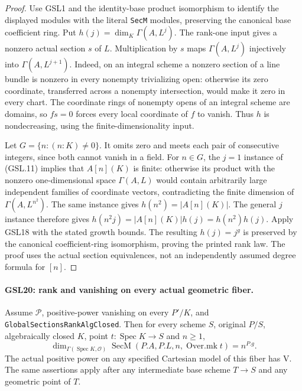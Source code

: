 \begin{proof}
Use GSL1 and the identity-base product isomorphism to identify
the displayed modules with the literal \texttt{SecM} modules,
preserving the canonical base coefficient ring.  Put
$h(j)=\dim_K\Gamma(A,L^j)$.  The rank-one input gives a nonzero
actual section $s$ of $L$.  Multiplication by $s$ maps
$\Gamma(A,L^j)$ injectively into $\Gamma(A,L^{j+1})$.
Indeed, on an integral scheme a nonzero section of a line bundle
is nonzero in every nonempty trivializing open: otherwise its
zero coordinate, transferred across a nonempty intersection,
would make it zero in every chart.  The coordinate rings of
nonempty opens of an integral scheme are domains, so
$fs=0$ forces every local coordinate of $f$ to vanish.
Thus $h$ is nondecreasing, using the finite-dimensionality input.

Let $G=\{n:(n:K)\ne0\}$.  It omits zero and meets each pair
of consecutive integers, since both cannot vanish in a field.
For $n\in G$, the $j=1$ instance of (GSL.11) implies that
$A[n](K)$ is finite: otherwise its product with the nonzero
one-dimensional space $\Gamma(A,L)$ would contain arbitrarily
large independent families of coordinate vectors, contradicting
the finite dimension of $\Gamma(A,L^{n^2})$.
The same instance gives $h(n^2)=|A[n](K)|$.  The general $j$
instance therefore gives
$h(n^2j)=|A[n](K)|h(j)=h(n^2)h(j)$.
Apply GSL18 with the stated growth bounds.  The resulting
$h(j)=j^g$ is preserved by the canonical coefficient-ring
isomorphism, proving the printed rank law.  The proof uses the
actual section equivalences, not an independently assumed
degree formula for $[n]$.
\end{proof}

\paragraph{GSL20: rank and vanishing on every actual geometric fiber.}
\label{claim:GSL20}
Assume $\mathcal P$, positive-power vanishing on every $P'/K$,
and \texttt{GlobalSectionsRankAlgClosed}.  Then for every scheme
$S$, original $P/S$, algebraically closed $K$, point
$t:\operatorname{Spec}K\to S$ and $n\ge1$,
\[
 \dim_{\Gamma(\operatorname{Spec}K,\mathcal O)}
    \operatorname{SecM}(P.A,P.L,n,\operatorname{Over.mk}t)
       =n^{P.g}. \tag{GSL.12}
\]
The actual positive power on any specified Cartesian model of this
fiber has $\mathrm V$.  The same assertions apply after any
intermediate base scheme $T\to S$ and any geometric point of $T$.

